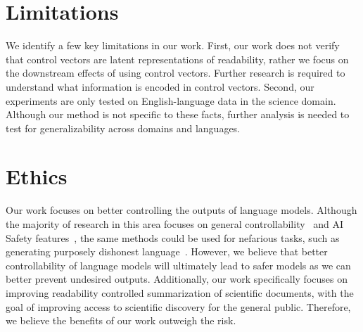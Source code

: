 \section{Limitations}\label{sec:limitations}
We identify a few key limitations in our work. First, our work does not verify that control vectors are latent representations of readability, rather we focus on the downstream effects of using control vectors. Further research is required to understand what information is encoded in control vectors. Second, our experiments are only tested on English-language data in the science domain. Although our method is not specific to these facts, further analysis is needed to test for generalizability across domains and languages.



\section{Ethics}\label{sec:ethics}
Our work focuses on better controlling the outputs of language models. Although the majority of research in this area focuses on general controllability~\cite{Keskar2019CTRLAC,Chen2024BenchmarkingLL,yang-klein-2021-fudge} and AI Safety features~\cite{zou2025representationengineeringtopdownapproach,rimsky-etal-2024-steering}, the same methods could be used for nefarious tasks, such as generating purposely dishonest language~\cite{BARMAN2024100545}. However, we believe that better controllability of language models will ultimately lead to safer models as we can better prevent undesired outputs. Additionally, our work specifically focuses on improving readability controlled summarization of scientific documents, with the goal of improving access to scientific discovery for the general public. Therefore, we believe the benefits of our work outweigh the risk.
